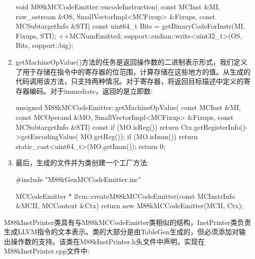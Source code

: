 \begin{enumerate}
\begin{cpp}
void M88kMCCodeEmitter::encodeInstruction(
        const MCInst &MI, raw_ostream &OS,
        SmallVectorImpl<MCFixup> &Fixups,
        const MCSubtargetInfo &STI) const {
    uint64_t Bits =
        getBinaryCodeForInstr(MI, Fixups, STI);
    ++MCNumEmitted;
    support::endian::write<uint32_t>(OS, Bits,
                                     support::big);
}
\end{cpp}

\item
getMachineOpValue()方法的任务是返回操作数的二进制表示形式，我们定义了用于存储在指令中的寄存器的位范围，计算存储在这些地方的值。从生成的代码调用该方法，只支持两种情况。对于寄存器，将返回目标描述中定义的寄存器编码。对于immediate，返回的是立即数:

\begin{cpp}
unsigned M88kMCCodeEmitter::getMachineOpValue(
        const MCInst &MI, const MCOperand &MO,
        SmallVectorImpl<MCFixup> &Fixups,
        const MCSubtargetInfo &STI) const {
    if (MO.isReg())
        return Ctx.getRegisterInfo()->getEncodingValue(
            MO.getReg());
    if (MO.isImm())
        return static_cast<uint64_t>(MO.getImm());
    return 0;
}
\end{cpp}

\item
最后，生成的文件并为类创建一个工厂方法:

\begin{cpp}
#include "M88kGenMCCodeEmitter.inc"

MCCodeEmitter *
llvm::createM88kMCCodeEmitter(const MCInstrInfo &MCII,
                              MCContext &Ctx) {
    return new M88kMCCodeEmitter(MCII, Ctx);
}
\end{cpp}
\end{enumerate}


M88kInstPrinter类具有与M88kMCCodeEmitter类相似的结构，InstPrinter类负责生成LLVM指令的文本表示。类的大部分是由TableGen生成的，但必须添加对输出操作数的支持。该类在M88kInstPrinter.h头文件中声明，实现在M88kInstPrinter.cpp文件中:

